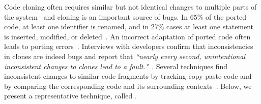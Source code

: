 Code cloning often requires similar but not identical changes to multiple parts of the system~\cite{Kim:2005:ESC:1081706.1081737} and cloning is an important source of bugs. In 65\% of the ported code, at least one identifier is renamed, and in 27\% cases at least one statement is inserted, modified, or deleted~\cite{Li2004:CP-Miner}. An incorrect adaptation of ported code often leads to porting errors~\cite{Jiang2007}. Interviews with developers confirm that inconsistencies in clones are indeed bugs and report that {\em ``nearly every second, unintentional inconsistent changes to clones lead to a fault."}~\cite{Juergens2009:clone-bug}.  Several techniques find inconsistent changes to similar code fragments by tracking copy-paste code and by comparing the corresponding code and its surrounding contexts~\cite{Li2004:CP-Miner, Jablonski2007:CReN, Ray2013:spa, Jiang2007, Jiang2007a}.  Below, we present a representative technique, called {\critics}.  %


